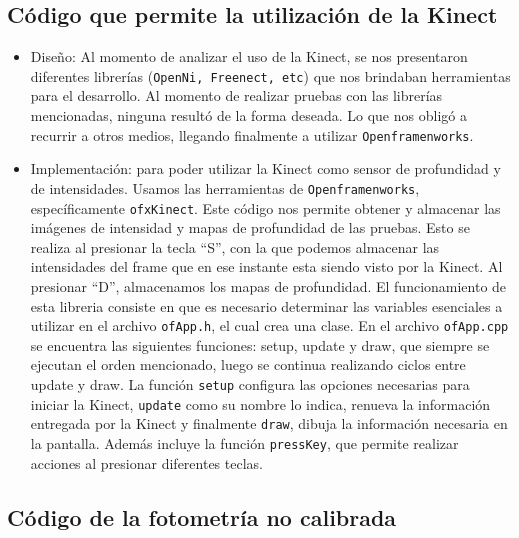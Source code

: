 \documentclass[twocolumn,11pts]{IEEEtran}
\begin{document}
\subsection{Código que permite la utilización de la Kinect}
\begin{itemize}
\item Diseño: Al momento de analizar el uso de la Kinect, se nos presentaron diferentes librerías (\texttt{OpenNi, Freenect, etc}) que nos brindaban herramientas para el desarrollo. Al momento de realizar pruebas con las librerías mencionadas, ninguna resultó de la forma deseada. Lo que nos obligó a recurrir a otros medios, llegando finalmente a utilizar \texttt{Openframenworks}.

\item Implementación: para poder utilizar la Kinect como sensor de profundidad y de intensidades. Usamos las herramientas de \texttt{Openframenworks}, específicamente \texttt{ofxKinect}. Este código nos permite obtener y almacenar las imágenes de intensidad y mapas de profundidad de las pruebas. Esto se realiza al presionar la tecla ``S'', con la que podemos almacenar las intensidades del frame que en ese instante esta siendo visto por la Kinect. Al presionar ``D'', almacenamos los mapas de profundidad. El funcionamiento de esta libreria consiste en que es necesario determinar las variables esenciales a utilizar en el archivo \texttt{ofApp.h}, el cual crea una clase. En el archivo \texttt{ofApp.cpp} se encuentra las siguientes funciones: setup, update y draw, que siempre se ejecutan el orden mencionado, luego se continua realizando ciclos entre update y draw. 
La función \texttt{setup} configura las opciones necesarias para iniciar la Kinect, \texttt{update} como su nombre lo indica, renueva la información entregada por la Kinect y finalmente \texttt{draw}, dibuja la información necesaria en la pantalla. Además incluye la función \texttt{pressKey}, que permite realizar acciones al presionar diferentes teclas.
\end{itemize}


\subsection{Código de la fotometría no calibrada}
\end{document}
